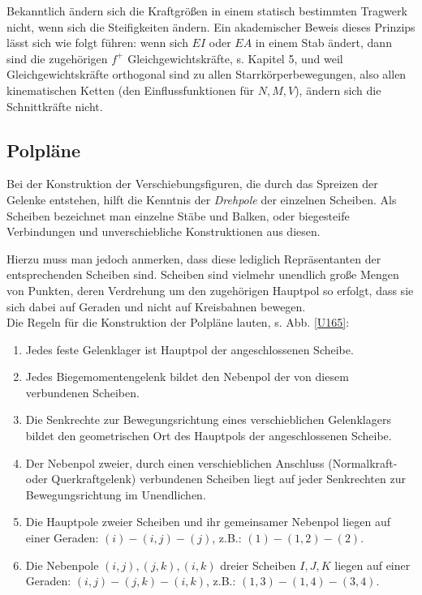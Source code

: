 \begin{remark}
Bekanntlich \"{a}ndern sich die Kraftgr\"{o}{\ss}en in einem statisch bestimmten Tragwerk nicht, wenn sich die Steifigkeiten \"{a}ndern. Ein \glq akademischer\grq{} Beweis dieses Prinzips l\"{a}sst sich wie folgt f\"{u}hren: wenn sich $EI$ oder $EA$ in einem Stab \"{a}ndert, dann sind die zugeh\"{o}rigen $f^+$ Gleichgewichtskr\"{a}fte, s. Kapitel 5, und weil Gleichgewichtskr\"{a}fte orthogonal sind zu allen Starrk\"{o}rperbewegungen, also allen kinematischen Ketten (den Einflussfunktionen f\"{u}r $N, M, V$), \"{a}ndern sich die  Schnittkr\"{a}fte nicht.\\
\end{remark}


{\textcolor{sectionTitleBlue}{\subsection{Polpl\"{a}ne}}}

Bei der Konstruktion der Verschiebungsfiguren, die durch das Spreizen der Gelenke entstehen, hilft die Kenntnis der {\em Drehpole\/} der einzelnen Scheiben. Als Scheiben bezeichnet man einzelne St\"{a}be und Balken, oder biegesteife Verbindungen und unverschiebliche Konstruktionen aus diesen.

Hierzu muss man jedoch anmerken, dass diese lediglich Repr\"{a}sentanten der entsprechenden Scheiben sind. Scheiben sind vielmehr unendlich gro{\ss}e Mengen von Punkten, deren Verdrehung um den zugeh\"{o}rigen Hauptpol so erfolgt, dass sie sich dabei auf Geraden und nicht auf Kreisbahnen bewegen. \\

Die Regeln f\"{u}r die Konstruktion der Polpl\"{a}ne lauten, s. Abb. \ref{U165}:\\

\begin{enumerate}
  \item Jedes feste Gelenklager ist Hauptpol der angeschlossenen Scheibe.
  \item Jedes Biegemomentengelenk bildet den Nebenpol der von diesem verbundenen Scheiben.
  \item Die Senkrechte zur Bewegungsrichtung eines verschieblichen Gelenklagers bildet den geometrischen Ort des Hauptpols der angeschlossenen Scheibe.
  \item Der Nebenpol zweier, durch einen verschieblichen Anschluss (Normalkraft- oder Querkraftgelenk) verbundenen Scheiben liegt auf jeder Senkrechten zur Bewegungsrichtung im Unendlichen.
  \item Die Hauptpole zweier Scheiben und ihr gemeinsamer Nebenpol liegen auf einer Geraden:
$(i)-(i, j)-(j)$, z.B.: $(1)-(1, 2)-(2)$.

  \item Die Nebenpole $(i, j), (j, k), (i, k)$ dreier Scheiben $I, J, K$ liegen auf einer Geraden: $(i, j)-(j, k)-(i, k)$, z.B.: $(1, 3)-(1, 4)-(3, 4)$.
  \end{enumerate}


